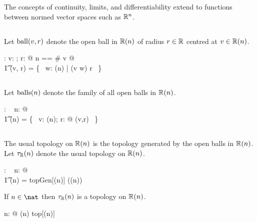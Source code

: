 \documentclass[11pt, oneside]{article}
\begin{document}
The concepts of continuity, limits, and differentiability extend to functions between normed vector spaces such as $\mathbb{R}^n$.

\subsection{}

Let $\operatorname{ball}(v,r)$ denote the open ball in $\mathbb{R}(n)$ of radius $r  \in \mathbb{R}$ centred at $v \in \mathbb{R}(n)$.

\begin{axdef}
	\ballRn: \Rinf \cross \R \fun \power \Rinf
\where
	\forall v: \Rinf; r: \R @ \LET n == \# v @ \\
	\t1	\ballRn(v, r) = \{~ w: \Rtuples(n) | \normR(v \vsubR w) \ltR r ~\}
\end{axdef}

\subsection{}

Let $\operatorname{balls}(n)$ denote the family of all open balls in $\mathbb{R}(n)$.

\begin{axdef}
	\ballsRn: \nat \fun \family~\Rinf
\where
	\forall n: \nat @ \\
	\t1	\ballsRn(n) =  \{~ v: \Rtuples(n); r: \R @ \ballRn(v,r) ~\}
\end{axdef}

\subsection{}

The usual topology on $\mathbb{R}(n)$ is the topology generated by the open balls in $\mathbb{R}(n)$.
Let $\tau_{\mathbb{R}}(n)$ denote the usual topology on $\mathbb{R}(n)$.

\begin{axdef}
	\tauRn: \nat \fun \family~\Rinf
\where
	\forall n: \nat @ \\
	\t1	\tauRn(n) = topGen[\Rtuples(n)] (\ballsRn(n))
\end{axdef}

\begin{remark}

If $n \in \nat$ then $\tau_{\mathbb{R}}(n)$ is a topology on $\mathbb{R}(n)$.

\begin{zed}
	\forall n: \nat @ \tauRn(n) \in top[\Rtuples(n)]
\end{zed}
\end{remark}
\end{document}
